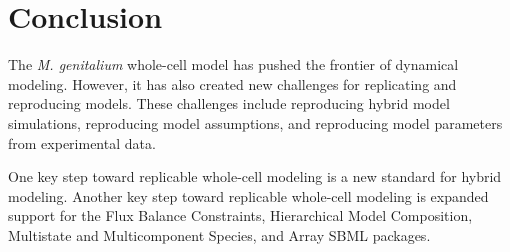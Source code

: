 \documentclass[journal,transmag,twoside]{IEEEtran}
\begin{document}
%






\section{Conclusion}

The \textit{M. genitalium} whole-cell model has pushed the frontier of dynamical modeling. 
However, it has also created new challenges for replicating and reproducing models.
These challenges include reproducing hybrid model simulations, reproducing model assumptions, and
reproducing model parameters from experimental data. 

One key step toward replicable whole-cell modeling is a new standard for hybrid modeling.
Another key step toward replicable whole-cell modeling is expanded support for the 
Flux Balance Constraints, Hierarchical Model Composition, Multistate and Multicomponent 
Species, and Array SBML packages. 
\end{document}
